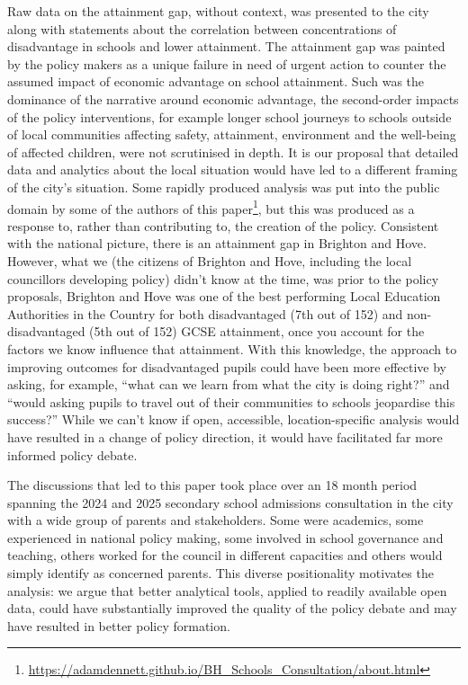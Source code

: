 \documentclass[
  12pt,
  titlepage]{article}
\begin{document}
Raw data on the attainment gap, without context, was presented to the
city along with statements about the correlation between concentrations
of disadvantage in schools and lower attainment. The attainment gap was
painted by the policy makers as a unique failure in need of urgent
action to counter the assumed impact of economic advantage on school
attainment. Such was the dominance of the narrative around economic
advantage, the second-order impacts of the policy interventions, for
example longer school journeys to schools outside of local communities
affecting safety, attainment, environment and the well-being of affected
children, were not scrutinised in depth. It is our proposal that
detailed data and analytics about the local situation would have led to
a different framing of the city's situation. Some rapidly produced
analysis was put into the public domain by some of the authors of this
paper\footnote{\url{https://adamdennett.github.io/BH_Schools_Consultation/about.html}},
but this was produced as a response to, rather than contributing to, the
creation of the policy. Consistent with the national picture, there is
an attainment gap in Brighton and Hove. However, what we (the citizens
of Brighton and Hove, including the local councillors developing policy)
didn't know at the time, was prior to the policy proposals, Brighton and
Hove was one of the best performing Local Education Authorities in the
Country for both disadvantaged (7th out of 152) and non-disadvantaged
(5th out of 152) GCSE attainment, once you account for the factors we
know influence that attainment. With this knowledge, the approach to
improving outcomes for disadvantaged pupils could have been more
effective by asking, for example, ``what can we learn from what the city
is doing right?'' and ``would asking pupils to travel out of their
communities to schools jeopardise this success?'' While we can't know if
open, accessible, location-specific analysis would have resulted in a
change of policy direction, it would have facilitated far more informed
policy debate.

The discussions that led to this paper took place over an 18 month
period spanning the 2024 and 2025 secondary school admissions
consultation in the city with a wide group of parents and stakeholders.
Some were academics, some experienced in national policy making, some
involved in school governance and teaching, others worked for the
council in different capacities and others would simply identify as
concerned parents. This diverse positionality motivates the analysis: we
argue that better analytical tools, applied to readily available open
data, could have substantially improved the quality of the policy debate
and may have resulted in better policy formation.
\end{document}
